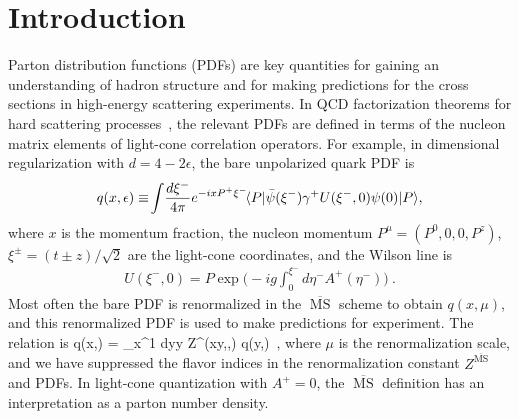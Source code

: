 \section{Introduction}

Parton distribution functions (PDFs) are key quantities for gaining an understanding of hadron structure and for making predictions for the cross sections in high-energy scattering experiments. In QCD factorization theorems for hard scattering processes~\cite{Collins:1989gx}, the relevant PDFs are defined in terms of the nucleon matrix elements of light-cone correlation operators. For example, in dimensional regularization with $d=4-2\epsilon$, the bare unpolarized quark PDF is
\begin{align} \label{eq:lcpdf}
	q(x,\epsilon) \equiv\! \int\! {d\xi^-\over 4\pi} e^{-ixP^+\xi^-}\! \langle P | \bar{\psi}  (\xi^-) \gamma^+ U (\xi^-, 0) \psi (0) | P \rangle ,
\end{align}
where $x$ is the momentum fraction, the nucleon momentum $P^\mu=(P^0,0,0,P^z)$, $\xi^{\pm}=(t\pm z)/\sqrt{2}$ are the light-cone coordinates, and the Wilson line is
\begin{align}
	U(\xi^-,0) = P\exp\biggl(-ig\int_0^{\xi^-} d\eta^- A^+(\eta^-)\biggr)\ .
\end{align}
Most often the bare PDF is renormalized in the $\overline{\ensuremath{\operatorname{MS}}}$ scheme to obtain $q(x,\mu)$, and this renormalized PDF  is used to make predictions for experiment. The relation is
\beq
	q(x,\epsilon) = \int_x^1 {dy\over y}\:  Z^{}\Bigl({x\over y},\epsilon,\mu\Bigr) q(y,\mu)\ ,
\eeq
where $\mu$ is the renormalization scale, and we have suppressed the flavor indices in the renormalization constant $Z^{\overline{\ensuremath{\operatorname{MS}}}}$ and PDFs. In light-cone quantization with $A^+=0$, the $\overline{\ensuremath{\operatorname{MS}}}$ definition has an interpretation as a parton number density.

